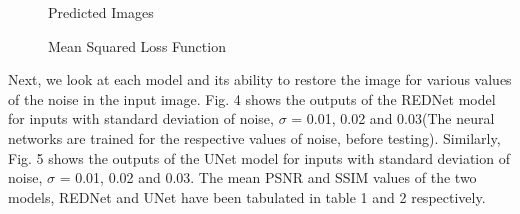 \documentclass[journal]{IEEEtran} %
\begin{document}
\begin{figure}[!tbp]
  \centering
  \hfill
  \caption{Predicted Images}
\end{figure}

\begin{figure}[!tbp]
  \centering
  \hfill
  \caption{Mean Squared Loss Function}
\end{figure}

Next, we look at each model and its ability to restore the image for various values of the noise in the input image. Fig. 4 shows the outputs of the REDNet model for inputs with standard deviation of noise, $\sigma$ = 0.01, 0.02 and 0.03(The neural networks are trained for the respective values of noise, before testing). 
Similarly, Fig. 5 shows the outputs of the UNet model for inputs with standard deviation of noise, $\sigma$ = 0.01, 0.02 and 0.03. The mean PSNR and SSIM values of the two models, REDNet and UNet have been tabulated in table 1 and 2 respectively.
\end{document}
